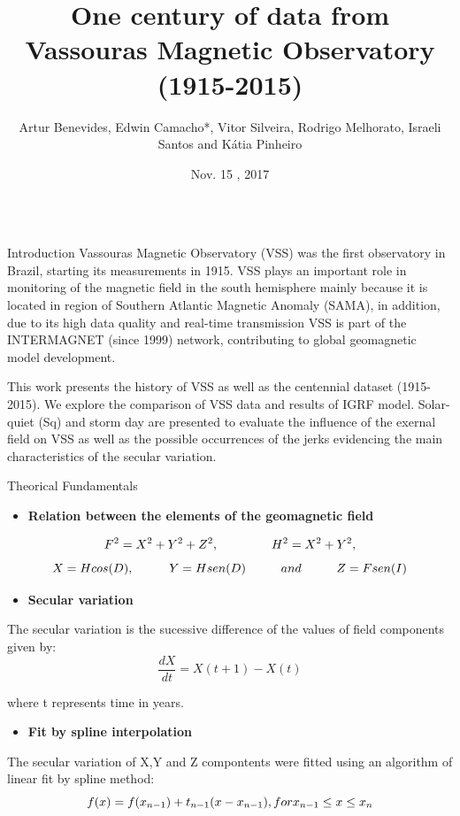 \documentclass[final,t]{beamer}
\title{\huge One century of data from Vassouras Magnetic Observatory (1915-2015)}
\author[Benevides et. al.]{Artur Benevides, Edwin Camacho*, Vitor Silveira, Rodrigo Melhorato, Israeli Santos and Kátia Pinheiro}
\institute[ON-MCTIC]{Observatório Nacional- ON/MCTIC}
\date[Nov , 2017]{Nov. 15 , 2017}
\begin{document}
  \begin{columns}[t]
    \begin{column}{.47\linewidth}
\begin{block}{Introduction}
\justifying	
 Vassouras Magnetic Observatory (VSS) was the first observatory in Brazil, starting its measurements in 1915. VSS plays an important role in monitoring of the magnetic field in the south hemisphere mainly because it is located in region of Southern Atlantic Magnetic Anomaly (SAMA), in addition, due to its high data quality and real-time transmission VSS is part of the INTERMAGNET (since 1999) network, contributing to global geomagnetic model development.
 
 This work presents the history of VSS as well as the centennial dataset (1915-2015). We	explore the comparison of VSS data and results of IGRF model. Solar-quiet (Sq) and storm day are presented to evaluate the influence of the exernal field on VSS as well as the possible occurrences of the jerks evidencing the main characteristics of the secular variation.	

\end{block}		

	
	\begin{block}{Theorical Fundamentals}
		
		
		\begin{itemize}
			\item \textbf{Relation between the elements of the geomagnetic field}
		\end{itemize}	
		\[ F^{2} = X^{2} + Y^{2} + Z^{2}, \hspace{1.5cm} H^{2} = X^{2} + Y^{2}, \]
		\[	   X = Hcos(D), \hspace{1.0cm} Y = Hsen(D) \hspace{1.0cm} and \hspace{1.0cm} Z = Fsen(I)\]
	
		
		
		\begin{itemize}	
			\item \textbf{Secular variation}
		\end{itemize}
		The secular variation is the sucessive difference of the values of field components given by:
		\[\frac{dX}{dt} = X(t+1)-X(t)\]
		
		where t represents time in years.
		
		\begin{itemize}
			\item \textbf{Fit by spline interpolation}
		\end{itemize}
		The secular variation of X,Y and Z compontents were fitted using an algorithm  of linear fit by spline method: 
		\[ f(x)= f(x_{n-1})+t_{n-1}(x-x_{n-1}), \\
		for x_{n-1} \le x \le x_{n} \]\\
		

\end{block}
\end{column}
\end{columns}
\end{document}
